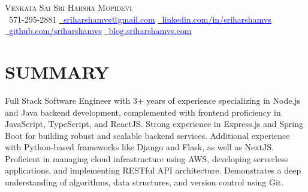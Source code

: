 \documentclass[letterpaper,10pt]{article}
\begin{document}
\begin{center}
    {\Huge \scshape Venkata Sai Sri Harsha Mopidevi} \\ 
    \small \raisebox{-0.1\height}\faPhone\ 571-295-2881 \hspace{3pt} 
    \href{mailto:sriharshamvs@gmail.com}{\raisebox{-0.2\height}\faEnvelope\  \textcolor{blue}{\underline{sriharshamvs@gmail.com}}} \hspace{3pt}
    \href{https://www.linkedin.com/in/sriharshamvs/}{\raisebox{-0.2\height}\faLinkedin\ \textcolor{blue}{\underline{linkedin.com/in/sriharshamvs}}} \hspace{3pt}
    \href{https://github.com/sriharshamvs}{\raisebox{-0.2\height}\faGithub\ \textcolor{blue}{\underline{github.com/sriharshamvs}}} \hspace{3pt}
    \vspace{2pt}\href{https://blog.sriharshamvs.com/}{\raisebox{-0.2\height}\faBlogger\ \textcolor{blue}{\underline{blog.sriharshamvs.com}}}


\end{center}


\section{SUMMARY}
\begin{justify}\small
Full Stack Software Engineer with 3+ years of experience specializing in Node.js and Java backend development, complemented with frontend proficiency in JavaScript, TypeScript, and ReactJS. Strong experience in Express.js and Spring Boot for building robust and scalable backend services. Additional experience with Python-based frameworks like Django and Flask, as well as NextJS. Proficient in managing cloud infrastructure using AWS, developing serverless applications, and implementing RESTful API architecture. Demonstrates a deep understanding of algorithms, data structures, and version control using Git.
\end{justify}

\end{document}
